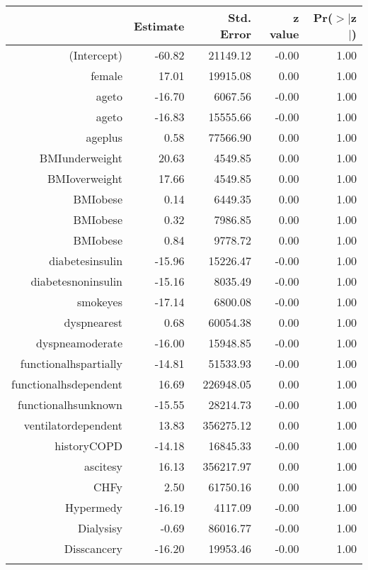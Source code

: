 \bigskip\bigskip
\centering
\begin{tabular}{rrrrr}
  \hline
 & Estimate & Std. Error & z value & Pr($>$$|$z$|$) \\ 
  \hline
(Intercept) & -60.82 & 21149.12 & -0.00 & 1.00 \\ 
  female & 17.01 & 19915.08 & 0.00 & 1.00 \\ 
  age\-65\-to\-74 & -16.70 & 6067.56 & -0.00 & 1.00 \\ 
  age\-75\-to\-84 & -16.83 & 15555.66 & -0.00 & 1.00 \\ 
  age\-85\-plus & 0.58 & 77566.90 & 0.00 & 1.00 \\ 
  BMI\-underweight & 20.63 & 4549.85 & 0.00 & 1.00 \\ 
  BMI\-overweight & 17.66 & 4549.85 & 0.00 & 1.00 \\ 
  BMI\-obese\-1 & 0.14 & 6449.35 & 0.00 & 1.00 \\ 
  BMI\-obese\-2 & 0.32 & 7986.85 & 0.00 & 1.00 \\ 
  BMI\-obese\-3 & 0.84 & 9778.72 & 0.00 & 1.00 \\ 
  diabetes\-insulin & -15.96 & 15226.47 & -0.00 & 1.00 \\ 
  diabetes\-noninsulin & -15.16 & 8035.49 & -0.00 & 1.00 \\ 
  smoke\-yes & -17.14 & 6800.08 & -0.00 & 1.00 \\ 
  dyspnea\-rest & 0.68 & 60054.38 & 0.00 & 1.00 \\ 
  dyspnea\-moderate & -16.00 & 15948.85 & -0.00 & 1.00 \\ 
  functional\-hs\-partially & -14.81 & 51533.93 & -0.00 & 1.00 \\ 
  functional\-hs\-dependent & 16.69 & 226948.05 & 0.00 & 1.00 \\ 
  functional\-hs\-unknown & -15.55 & 28214.73 & -0.00 & 1.00 \\ 
  ventilator\-dependent & 13.83 & 356275.12 & 0.00 & 1.00 \\ 
  history\-COPD & -14.18 & 16845.33 & -0.00 & 1.00 \\ 
  ascites\-y & 16.13 & 356217.97 & 0.00 & 1.00 \\ 
  CHF\-y & 2.50 & 61750.16 & 0.00 & 1.00 \\ 
  Hyper\-med\-y & -16.19 & 4117.09 & -0.00 & 1.00 \\ 
  Dialysis\-y & -0.69 & 86016.77 & -0.00 & 1.00 \\ 
  Diss\-cancer\-y & -16.20 & 19953.46 & -0.00 & 1.00 \\ 
$$
\end{tabular}
